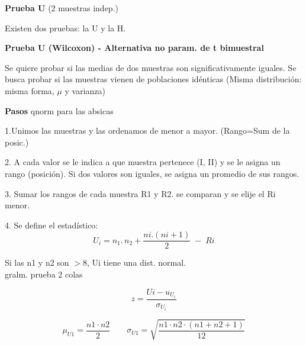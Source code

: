 \documentclass[12pt,a4paper,landscape]{article}
\begin{document}
{\fontsize{20}{24}\selectfont\bfseries Prueba U} {\fontsize{17}{20}\selectfont (2 muestras indep.)}

\vspace{4pt}

\begin{minipage}[t]{0.46\textwidth}
\vspace{0pt}
Existen dos pruebas: la U y la H.

\textbf{Prueba U (Wilcoxon) - Alternativa no param. de t bimuestral}

Se quiere probar si las medias de dos muestras son significativamente iguales. Se busca probar si las muestras vienen de poblaciones idénticas (Misma distribución: misma forma, $\mu$ y varianza)

\textbf{Pasos} \hspace{1.4cm} qnorm para las absicas

1.Unimos las muestras y las ordenamos de menor a mayor. (Rango=Sum de la posic.)

2. A cada valor se le indica a que muestra pertenece (I, II) y se le asigna un rango (posición). Si dos valores son iguales, se asigna un promedio de sus rangos.

3. Sumar los rangos de cada muestra R1 y R2. se comparan y se elije el Ri menor.

4. Se define el estadístico:
\[
U_i = n_1.\, n_2 + \frac{ni.(ni+1)}{2} \; - \; Ri
\]

\begin{minipage}[t]{0.54\textwidth}
\vspace{0pt}
Si las n1 y n2 son $> 8$, Ui tiene una dist. normal. \\
gralm. prueba 2 colas
\end{minipage}\hfill
\begin{minipage}[t]{0.42\textwidth}
\vspace{0pt}
\[
z = \frac{Ui - u_{U_i}}{\sigma_{U_i}}
\]
\end{minipage}

\vspace{2pt}
\[
\mu_{U1} = \frac{n1\cdot n2}{2}
\qquad
\sigma_{U1} = \sqrt{\frac{n1\cdot n2\cdot(n1+n2+1)}{12}}
\]
\end{minipage}\hfill
\end{document}
